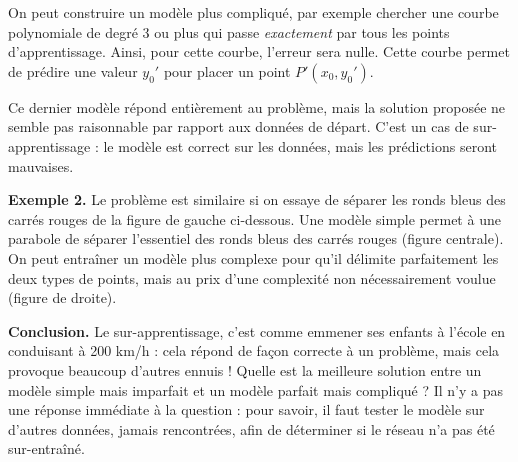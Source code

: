 \documentclass[11pt,class=report,crop=false]{standalone}
\begin{document}

On peut construire un modèle plus compliqué, par exemple chercher une courbe polynomiale de degré $3$ ou plus qui passe \emph{exactement} par tous les points d'apprentissage. Ainsi, pour cette courbe, l'erreur sera nulle. Cette courbe permet de prédire une valeur $y_0'$ pour placer un point $P'(x_0,y_0')$. 

Ce dernier modèle répond entièrement au problème, mais la solution proposée ne semble pas raisonnable par rapport aux données de départ. C'est un cas de sur-apprentissage : le modèle est correct sur les données, mais les prédictions seront mauvaises.

\bigskip

\textbf{Exemple 2.}
Le problème est similaire si on essaye de séparer les ronds bleus des carrés rouges de la figure de gauche ci-dessous. Une modèle simple permet à une parabole de séparer l'essentiel des ronds bleus des carrés rouges (figure centrale). On peut entraîner un modèle plus complexe pour qu'il délimite parfaitement les deux types de points, mais au prix d'une complexité non nécessairement voulue (figure de droite).

\textbf{Conclusion.}
Le sur-apprentissage, c'est comme emmener ses enfants à l'école en conduisant à 200 km/h : cela répond de façon correcte à un problème, mais cela provoque beaucoup d'autres ennuis !  
Quelle est la meilleure solution entre un modèle simple mais imparfait et un modèle parfait mais compliqué ? Il n'y a pas une réponse immédiate à la question : pour savoir, il faut tester le modèle sur d'autres données, jamais rencontrées, afin de déterminer si le réseau n'a pas été sur-entraîné.
\end{document}
